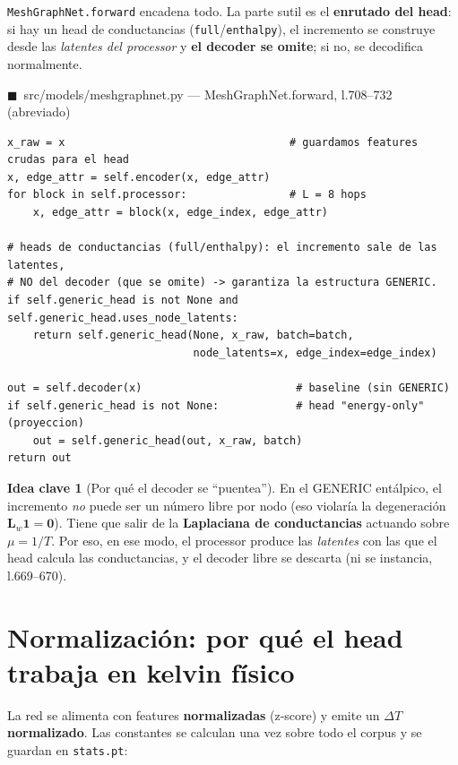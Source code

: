 \documentclass[11pt]{article}
\newcommand{\Lw}{\bm{L}_{w}}
\theoremstyle{definition}
\newtheorem{idea}{Idea clave}[section]
\theoremstyle{plain}
\newcommand{\srcref}[1]{\par\smallskip\noindent
  {\footnotesize\ttfamily\textcolor{srcblue}{$\blacksquare$\ #1}}\par\vspace{1pt}}
\begin{document}
\texttt{MeshGraphNet.forward} encadena todo. La parte sutil es el \textbf{enrutado
del head}: si hay un head de conductancias (\texttt{full}/\texttt{enthalpy}), el
incremento se construye desde las \emph{latentes del processor} y \textbf{el decoder
se omite}; si no, se decodifica normalmente.

\srcref{src/models/meshgraphnet.py — MeshGraphNet.forward, l.708--732 (abreviado)}
\begin{lstlisting}
x_raw = x                                   # guardamos features crudas para el head
x, edge_attr = self.encoder(x, edge_attr)
for block in self.processor:                # L = 8 hops
    x, edge_attr = block(x, edge_index, edge_attr)

# heads de conductancias (full/enthalpy): el incremento sale de las latentes,
# NO del decoder (que se omite) -> garantiza la estructura GENERIC.
if self.generic_head is not None and self.generic_head.uses_node_latents:
    return self.generic_head(None, x_raw, batch=batch,
                             node_latents=x, edge_index=edge_index)

out = self.decoder(x)                        # baseline (sin GENERIC)
if self.generic_head is not None:            # head "energy-only" (proyeccion)
    out = self.generic_head(out, x_raw, batch)
return out
\end{lstlisting}

\begin{idea}[Por qué el decoder se ``puentea'']
En el GENERIC entálpico, el incremento \emph{no} puede ser un número libre por nodo
(eso violaría la degeneración $\Lw\bm 1=\bm0$). Tiene que salir de la
\textbf{Laplaciana de conductancias} actuando sobre $\mu=1/T$. Por eso, en ese modo,
el processor produce las \emph{latentes} con las que el head calcula las
conductancias, y el decoder libre se descarta (ni se instancia, l.669--670).
\end{idea}

\section{Normalización: por qué el head trabaja en kelvin físico}
\label{sec:norm}

La red se alimenta con features \textbf{normalizadas} (z-score) y emite un
$\Delta T$ \textbf{normalizado}. Las constantes se calculan una vez sobre todo el
corpus y se guardan en \texttt{stats.pt}:
\end{document}
